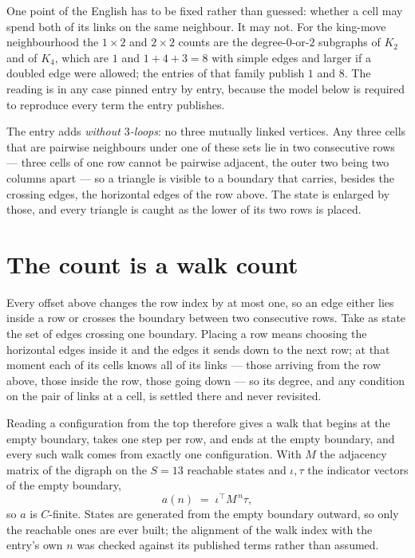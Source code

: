 \documentclass[11pt,a4paper]{article}
\theoremstyle{plain}
\theoremstyle{definition}
\begin{document}
One point of the English has to be fixed rather than guessed: whether a cell may spend both of
its links on the same neighbour. It may not. For the king-move neighbourhood the $1\times2$
and $2\times2$ counts are the degree-$0$-or-$2$ subgraphs of $K_2$ and of $K_4$, which are $1$
and $1+4+3=8$ with simple edges and larger if a doubled edge were allowed; the entries of that
family publish $1$ and $8$. The reading is in any case pinned entry by entry, because the
model below is required to reproduce every term the entry publishes.

The entry adds \emph{without $3$-loops}: no three mutually linked vertices. Any three cells
that are pairwise neighbours under one of these sets lie in two consecutive rows --- three
cells of one row cannot be pairwise adjacent, the outer two being two columns apart --- so a
triangle is visible to a boundary that carries, besides the crossing edges, the horizontal
edges of the row above. The state is enlarged by those, and every triangle is caught as the
lower of its two rows is placed.

\section{The count is a walk count}

Every offset above changes the row index by at most one, so an edge either lies inside a row
or crosses the boundary between two consecutive rows. Take as state the set of edges crossing
one boundary. Placing a row means choosing the horizontal edges inside it and the edges it
sends down to the next row; at that moment each of its cells knows all of its links --- those
arriving from the row above, those inside the row, those going down --- so its degree, and any
condition on the pair of links at a cell, is settled there and never revisited.

Reading a configuration from the top therefore gives a walk that begins at the empty boundary,
takes one step per row, and ends at the empty boundary, and every such walk comes from exactly
one configuration. With $M$ the adjacency matrix of the digraph on the $S=13$ reachable
states and $\iota,\tau$ the indicator vectors of the empty boundary,
\[
a(n)\;=\;\iota^{\!\top}M^{\,n}\tau ,
\]
so $a$ is $C$-finite. States are generated from the empty boundary outward, so only the
reachable ones are ever built; the alignment of the walk index with the entry's own $n$ was
checked against its published terms rather than assumed.
\end{document}
